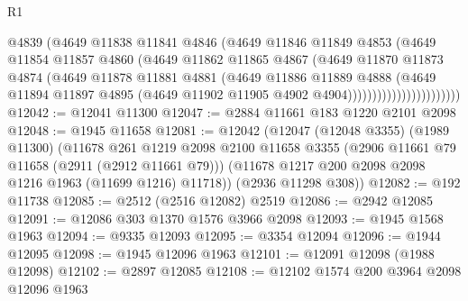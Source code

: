\begin{lexlean}{R1}
\begin{coremodule}
                                @4839
                                (@4649
                                  @11838
                                  @11841
                                  @4846
                                  (@4649
                                    @11846
                                    @11849
                                    @4853
                                    (@4649
                                      @11854
                                      @11857
                                      @4860
                                      (@4649
                                        @11862
                                        @11865
                                        @4867
                                        (@4649
                                          @11870
                                          @11873
                                          @4874
                                          (@4649
                                            @11878
                                            @11881
                                            @4881
                                            (@4649
                                              @11886
                                              @11889
                                              @4888
                                              (@4649
                                                @11894
                                                @11897
                                                @4895
                                                (@4649
                                                  @11902
                                                  @11905
                                                  @4902
                                                  @4904)))))))))))))))))))))))
@12042 := @12041 @11300
@12047 := @2884 @11661 @183 @1220 @2101 @2098
@12048 := @1945 @11658
@12081 := @12042
    (@12047
      (@12048 @3355)
      (@1989 @11300)
      (@11678
        @261
        @1219
        @2098
        @2100
        @11658
        @3355
        (@2906 @11661 @79 @11658 (@2911 (@2912 @11661 @79)))
        (@11678 @1217 @200 @2098 @2098 @1216 @1963 (@11699 @1216) @11718))
      (@2936 @11298 @308))
@12082 := @192 @11738
@12085 := @2512 (@2516 @12082) @2519
@12086 := @2942 @12085
@12091 := @12086 @303 @1370 @1576 @3966 @2098
@12093 := @1945 @1568 @1963
@12094 := @9335 @12093
@12095 := @3354 @12094
@12096 := @1944 @12095
@12098 := @1945 @12096 @1963
@12101 := @12091 @12098 (@1988 @12098)
@12102 := @2897 @12085
@12108 := @12102 @1574 @200 @3964 @2098 @12096 @1963

\end{coremodule}
\end{lexlean}
